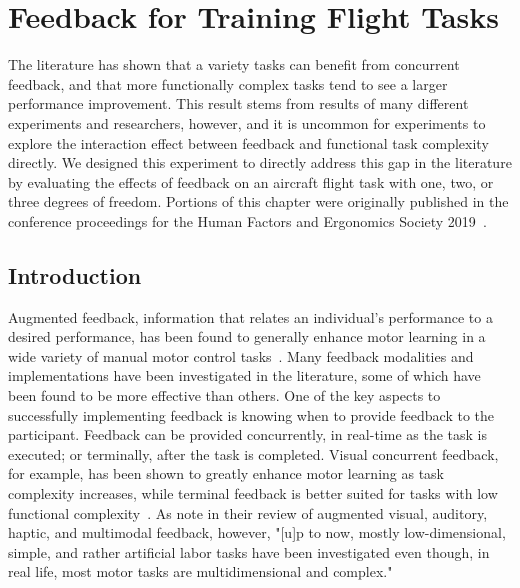 \chapter{Feedback for Training Flight Tasks}
\label{chapter:aircraftfeedback}

The literature has shown that a variety tasks can benefit from concurrent feedback, and that more functionally complex tasks tend to see a larger performance improvement.
This result stems from results of many different experiments and researchers, however, and it is uncommon for experiments to explore the interaction effect between feedback and functional task complexity directly.
We designed this experiment to directly address this gap in the literature by evaluating the effects of feedback on an aircraft flight task with one, two, or three degrees of freedom.
Portions of this chapter were originally published in the conference proceedings for the Human Factors and Ergonomics Society 2019~\citep{RN42}.

\section{Introduction}
Augmented feedback, information that relates an individual's performance to a desired performance, has been found to generally enhance motor learning in a wide variety of manual motor control tasks~\citep{salmoni_knowledge_1984}.
Many feedback modalities and implementations have been investigated in the literature, some of which have been found to be more effective than others.
One of the key aspects to successfully implementing feedback is knowing when to provide feedback to the participant.
Feedback can be provided concurrently, in real-time as the task is executed; or terminally, after the task is completed.
Visual concurrent feedback, for example, has been shown to greatly enhance motor learning as task complexity increases, while terminal feedback is better suited for tasks with low functional complexity~\citep{sigrist_augmented_2013}.
As \citeauthor{sigrist_augmented_2013} note in their review of augmented visual, auditory, haptic, and multimodal feedback, however, "[u]p to now, mostly low-dimensional, simple, and rather artificial labor tasks have been investigated even though, in real life, most motor tasks are multidimensional and complex."

